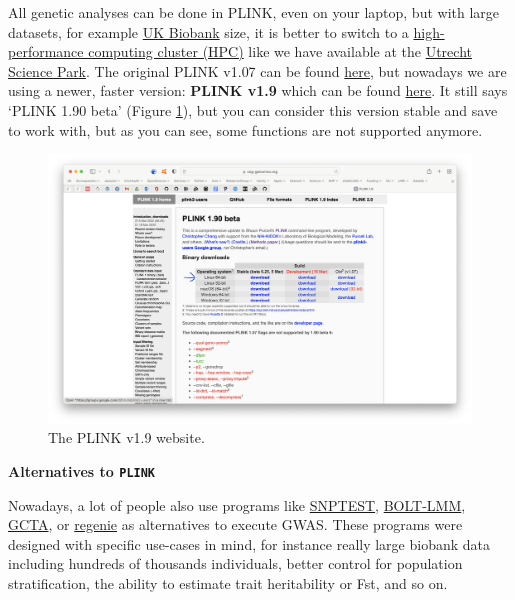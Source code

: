 \documentclass[
]{book}
\newcommand{\passthrough}[1]{#1}
\begin{document}
All genetic analyses can be done in PLINK, even on your laptop, but with large datasets, for example \href{https://www.ukbiobank.ac.uk}{UK Biobank} size, it is better to switch to a \href{https://en.wikipedia.org/wiki/High-performance_computing}{high-performance computing cluster (HPC)} like we have available at the \href{https://wiki.bioinformatics.umcutrecht.nl/bin/view/HPC/WebHome}{Utrecht Science Park}. The original PLINK v1.07 can be found \href{https://zzz.bwh.harvard.edu/plink/index.shtml}{here}, but nowadays we are using a newer, faster version: \textbf{PLINK v1.9} which can be found \href{https://www.cog-genomics.org/plink2}{here}. It still says `PLINK 1.90 beta' (Figure \ref{fig:plink}), but you can consider this version stable and save to work with, but as you can see, some functions are not supported anymore.

\begin{figure}[H]

{\centering \includegraphics[width=43.11in]{img/plink} 

}

\caption{The PLINK v1.9 website.}\label{fig:plink}
\end{figure}

\textbf{Alternatives to \passthrough{\lstinline!PLINK!}}

Nowadays, a lot of people also use programs like \href{snptest}{SNPTEST}, \href{https://data.broadinstitute.org/alkesgroup/BOLT-LMM/}{BOLT-LMM}, \href{http://cnsgenomics.com/software/gcta/\#Overview}{GCTA}, or \href{https://rgcgithub.github.io/regenie/}{regenie} as alternatives to execute GWAS. These programs were designed with specific use-cases in mind, for instance really large biobank data including hundreds of thousands individuals, better control for population stratification, the ability to estimate trait heritability or Fst, and so on.
\end{document}
